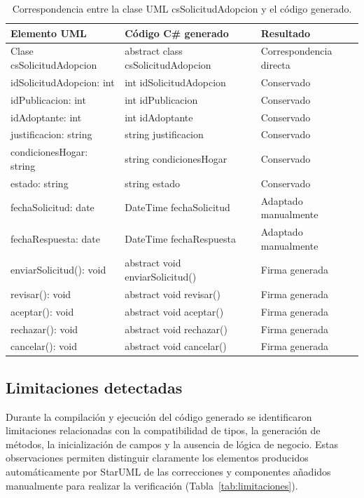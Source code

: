 \documentclass[journal,onecolumn]{IEEEtran}
\begin{document}
\begin{table}[H]
	\centering
	\caption{Correspondencia entre la clase UML csSolicitudAdopcion y el código generado.}
	\label{tab:correspondencia-modelo-codigo}
	\begin{tabular}{|l|l|l|}
		\hline
		\textbf{Elemento UML} & \textbf{Código C\# generado} & \textbf{Resultado} \\
		\hline
		Clase csSolicitudAdopcion & abstract class csSolicitudAdopcion & Correspondencia directa \\
		\hline
		idSolicitudAdopcion: int & int idSolicitudAdopcion & Conservado \\
		\hline
		idPublicacion: int & int idPublicacion & Conservado \\
		\hline
		idAdoptante: int & int idAdoptante & Conservado \\
		\hline
		justificacion: string & string justificacion & Conservado \\
		\hline
		condicionesHogar: string & string condicionesHogar & Conservado \\
		\hline
		estado: string & string estado & Conservado \\
		\hline
		fechaSolicitud: date & DateTime fechaSolicitud & Adaptado manualmente \\
		\hline
		fechaRespuesta: date & DateTime fechaRespuesta & Adaptado manualmente \\
		\hline
		enviarSolicitud(): void & abstract void enviarSolicitud() & Firma generada \\
		\hline
		revisar(): void & abstract void revisar() & Firma generada \\
		\hline
		aceptar(): void & abstract void aceptar() & Firma generada \\
		\hline
		rechazar(): void & abstract void rechazar() & Firma generada \\
		\hline
		cancelar(): void & abstract void cancelar() & Firma generada \\
		\hline
	\end{tabular}
\end{table}

\subsection{Limitaciones detectadas}

Durante la compilación y ejecución del código generado se identificaron limitaciones relacionadas con la compatibilidad de tipos, la generación de métodos, la inicialización de campos y la ausencia de lógica de negocio. Estas observaciones permiten distinguir claramente los elementos producidos automáticamente por StarUML de las correcciones y componentes añadidos manualmente para realizar la verificación (Tabla~\ref{tab:limitaciones}).
\end{document}
